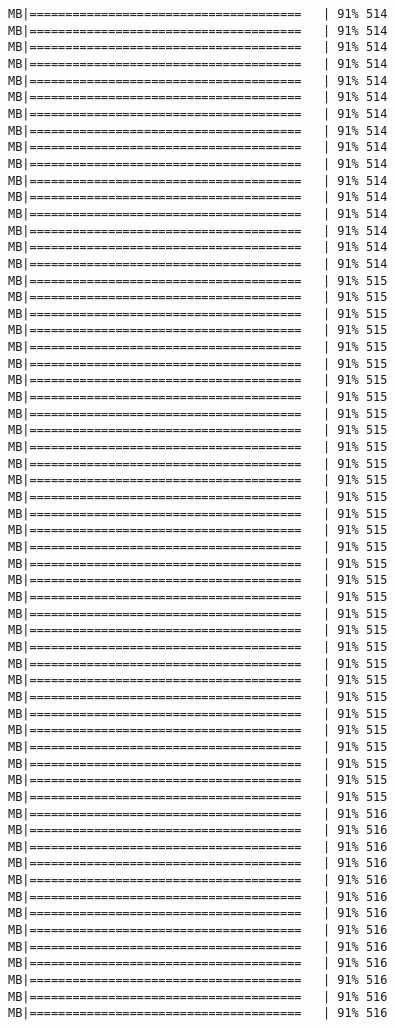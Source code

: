 \documentclass[
]{article}
\begin{document}
\begin{verbatim}
MB|======================================   | 91% 514 MB|======================================   | 91% 514 MB|======================================   | 91% 514 MB|======================================   | 91% 514 MB|======================================   | 91% 514 MB|======================================   | 91% 514 MB|======================================   | 91% 514 MB|======================================   | 91% 514 MB|======================================   | 91% 514 MB|======================================   | 91% 514 MB|======================================   | 91% 514 MB|======================================   | 91% 514 MB|======================================   | 91% 514 MB|======================================   | 91% 514 MB|======================================   | 91% 514 MB|======================================   | 91% 514 MB|======================================   | 91% 515 MB|======================================   | 91% 515 MB|======================================   | 91% 515 MB|======================================   | 91% 515 MB|======================================   | 91% 515 MB|======================================   | 91% 515 MB|======================================   | 91% 515 MB|======================================   | 91% 515 MB|======================================   | 91% 515 MB|======================================   | 91% 515 MB|======================================   | 91% 515 MB|======================================   | 91% 515 MB|======================================   | 91% 515 MB|======================================   | 91% 515 MB|======================================   | 91% 515 MB|======================================   | 91% 515 MB|======================================   | 91% 515 MB|======================================   | 91% 515 MB|======================================   | 91% 515 MB|======================================   | 91% 515 MB|======================================   | 91% 515 MB|======================================   | 91% 515 MB|======================================   | 91% 515 MB|======================================   | 91% 515 MB|======================================   | 91% 515 MB|======================================   | 91% 515 MB|======================================   | 91% 515 MB|======================================   | 91% 515 MB|======================================   | 91% 515 MB|======================================   | 91% 515 MB|======================================   | 91% 515 MB|======================================   | 91% 515 MB|======================================   | 91% 516 MB|======================================   | 91% 516 MB|======================================   | 91% 516 MB|======================================   | 91% 516 MB|======================================   | 91% 516 MB|======================================   | 91% 516 MB|======================================   | 91% 516 MB|======================================   | 91% 516 MB|======================================   | 91% 516 MB|======================================   | 91% 516 MB|======================================   | 91% 516 MB|======================================   | 91% 516 MB|======================================   | 91% 516 
\end{verbatim}
\end{document}
